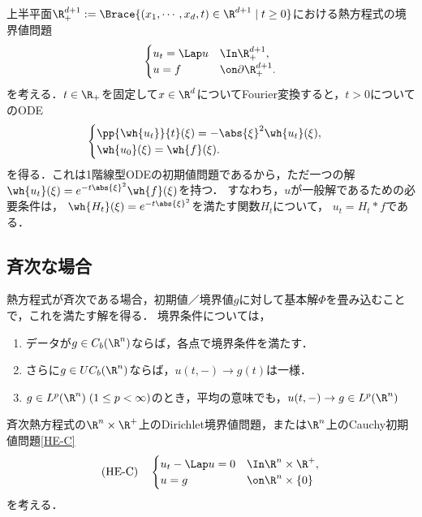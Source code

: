 \documentclass[uplatex,dvipdfmx]{jsreport}
\begin{document}
\begin{observation}
    上半平面$\R^{d+1}_+:=\Brace{(x_1,\cdots,x_d,t)\in\R^{d+1}\mid t\ge0}$における熱方程式の境界値問題
    \[\begin{cases}
        u_t=\Lap u&\In \R^{d+1}_+,\\
        u=f&\on\partial\R^{d+1}_+.
    \end{cases}\]
    を考える．$t\in\R_+$を固定して$x\in\R^d$についてFourier変換すると，$t>0$についてのODE
    \[\begin{cases}
        \pp{\wh{u_t}}{t}(\xi)=-\abs{\xi}^2\wh{u_t}(\xi),\\
        \wh{u_0}(\xi)=\wh{f}(\xi).
    \end{cases}\]
    を得る．これは1階線型ODEの初期値問題であるから，ただ一つの解$\wh{u_t}(\xi)=e^{-t\abs{\xi}^2}\wh{f}(\xi)$を持つ．
    すなわち，$u$が一般解であるための必要条件は，
    $\wh{H_t}(\xi)=e^{-t\abs{\xi}^2}$を満たす関数$H_t$について，
    $u_t=H_t*f$である．
\end{observation}

\subsection{斉次な場合}

\begin{tcolorbox}[colframe=ForestGreen, colback=ForestGreen!10!white,breakable,colbacktitle=ForestGreen!40!white,coltitle=black,fonttitle=\bfseries\sffamily,
    title=]
    熱方程式が斉次である場合，初期値／境界値$g$に対して基本解$\Phi$を畳み込むことで，これを満たす解を得る．
    境界条件については，
    \begin{enumerate}
        \item データが$g\in C_b(\R^n)$ならば，各点で境界条件を満たす．
        \item さらに$g\in UC_b(\R^n)$ならば，$u(t,-)\to g(t)$は一様．
        \item $g\in L^p(\R^n)\;(1\le p<\infty)$のとき，平均の意味でも，$u(t,-)\to g\in L^p(\R^n)$
    \end{enumerate}
\end{tcolorbox}

\begin{problem*}
    斉次熱方程式の$\R^n\times\R^+$上のDirichlet境界値問題，または$\R^n$上のCauchy初期値問題\ref{HE-C}
    \[\text{(HE-C)}\quad\begin{cases}
        u_t-\Lap u=0&\In\R^n\times\R^+,\\
        u=g&\on\R^n\times\{0\}
    \end{cases}\]
    を考える．
\end{problem*}
\end{document}
